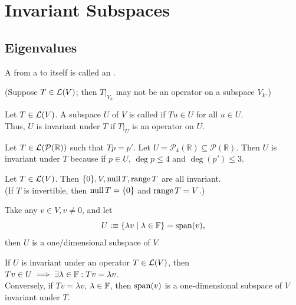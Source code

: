\section{Invariant Subspaces}

\subsection{Eigenvalues}

\begin{mydef} [operator]
  A \lm from a \vs to itself is called an .
\end{mydef}

(Suppose $T\in \mathcal{L}(V)$; then $\left.T\right|_{V_{k}}$ may not be an operator on a subspace $V_k$.)

\begin{mydef} 
  Let $T\in \mathcal{L}(V)$. A subspace $U$ of $V$ is called  if $Tu \in U$ for all $u \in U$. \\
  Thus, $U$ is invariant under $T$ if $\left.T\right|_{U}$ is an operator on $U$.
\end{mydef}

\begin{example}
  Let $T\in \mathcal{L}(\mathcal{P}(\mathbb{R}))$ such that $Tp=p'$. Let $U=\mathcal{P}_4(\mathbb{R}) \subseteq \mathcal{P}(\mathbb{R})$. Then $U$ is invariant under $T$
  because if $p \in U$, $\deg p \leq 4$ and $\deg (p') \leq 3$.
\end{example}

\begin{example}
  Let $T\in \mathcal{L}(V)$. Then $\{0\}, V, \operatorname{null} T, \operatorname{range} T$ are all invariant. \\
  (If $T$ is invertible, then $\operatorname{null} T = \{0\}$ and $\operatorname{range} T=V$.)
\end{example}


Take any $v\in V, v\neq 0$, and let
\begin{equation}
  U :\equiv \{  \lambda v \mid \lambda \in \mathbb{F} \} = \operatorname{span} (v),
\end{equation}
then $U$ is a one\-/dimensional subspace of $V$.

If $U$ is invariant under an operator $T \in \mathcal{L} (V)$, then $Tv \in U \implies \exists \lambda \in \mathbb{F}: Tv = \lambda v$. \\
Conversely, if $Tv = \lambda v$, $\lambda \in \mathbb{F}$, then $\operatorname{span} (v)$ is a one-dimensional subspace of $V$ invariant under $T$.

